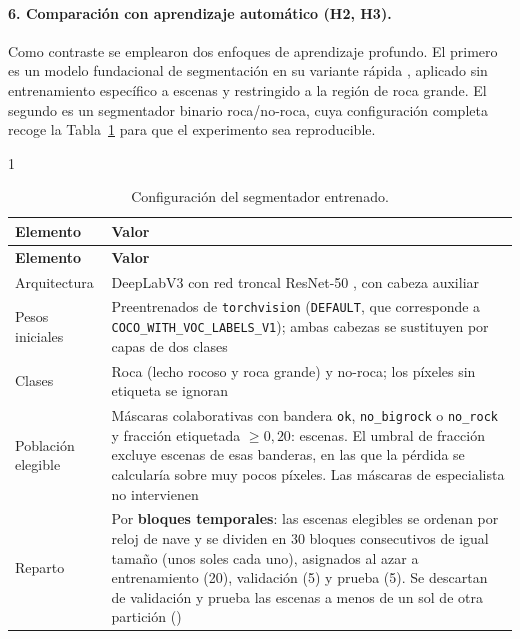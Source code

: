 \paragraph{6. Comparación con aprendizaje automático (H2, H3).} Como contraste se emplearon
dos enfoques de aprendizaje profundo. El primero es un modelo fundacional de segmentación
\citep{kirillov2023sam} en su variante rápida \citep{zhao2023fastsam}, aplicado sin
entrenamiento específico a \cSamN{} escenas y restringido a la región de roca grande. El
segundo es un
segmentador binario roca/no-roca, cuya configuración completa recoge la
Tabla~\ref{tab:deeplab-config} para que el experimento sea reproducible.

\begin{spacing}{1}
\small
\begin{longtable}{p{4.0cm}p{10.0cm}}
  \caption[Configuración del segmentador entrenado]{Configuración del segmentador entrenado.}
  \label{tab:deeplab-config}\\
  \toprule
  \textbf{Elemento} & \textbf{Valor} \\
  \midrule
  \endfirsthead
  \toprule
  \textbf{Elemento} & \textbf{Valor} \\
  \midrule
  \endhead
    Arquitectura & DeepLabV3 con red troncal ResNet-50 \citep{chen2017deeplab}, con cabeza
      auxiliar \\
    Pesos iniciales & Preentrenados de \texttt{torchvision} (\texttt{DEFAULT}, que corresponde a \texttt{COCO\_WITH\_VOC\_LABELS\_V1}); ambas cabezas se
      sustituyen por capas de dos clases \\
    Clases & Roca (lecho rocoso y roca grande) y no-roca; los píxeles sin etiqueta se ignoran \\
    Población elegible & Máscaras colaborativas con bandera \texttt{ok}, \texttt{no\_bigrock} o
      \texttt{no\_rock} y fracción etiquetada $\geq 0{,}20$: \cSegElegibles{} escenas. El umbral
      de fracción excluye \cSegExcluidas{} escenas de esas banderas, en las que la pérdida se
      calcularía sobre muy pocos píxeles. Las máscaras de especialista no intervienen \\
    Reparto & Por \textbf{bloques temporales}: las escenas elegibles se ordenan por reloj de nave
      y se dividen en 30 bloques consecutivos de igual tamaño (unos \cSegSolesBloque{} soles cada
      uno), asignados al azar a entrenamiento (20), validación (5) y prueba (5). Se descartan de
      validación y prueba las escenas a menos de un sol de otra partición (\cSegMargen{}) \\

\end{longtable}
\end{spacing}
